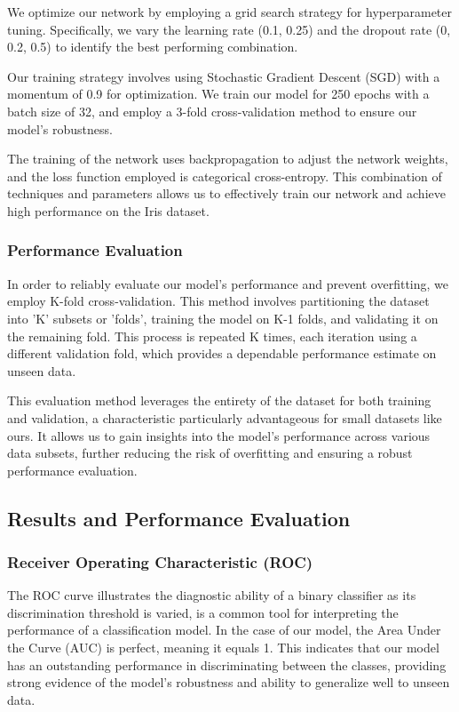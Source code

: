 \documentclass[conference]{inc/IEEEtran}
\begin{document}
We optimize our network by employing a grid search strategy for hyperparameter tuning. Specifically, we vary the learning rate (0.1, 0.25) and the dropout rate (0, 0.2, 0.5) to identify the best performing combination.

Our training strategy involves using Stochastic Gradient Descent (SGD) with a momentum of 0.9 for optimization. We train our model for 250 epochs with a batch size of 32, and employ a 3-fold cross-validation method to ensure our model's robustness.

The training of the network uses backpropagation to adjust the network weights, and the loss function employed is categorical cross-entropy. This combination of techniques and parameters allows us to effectively train our network and achieve high performance on the Iris dataset.

\subsubsection{Performance Evaluation}

In order to reliably evaluate our model's performance and prevent overfitting, we employ K-fold cross-validation. This method involves partitioning the dataset into 'K' subsets or 'folds', training the model on K-1 folds, and validating it on the remaining fold. This process is repeated K times, each iteration using a different validation fold, which provides a dependable performance estimate on unseen data.

This evaluation method leverages the entirety of the dataset for both training and validation, a characteristic particularly advantageous for small datasets like ours. It allows us to gain insights into the model's performance across various data subsets, further reducing the risk of overfitting and ensuring a robust performance evaluation.

\subsection{Results and Performance Evaluation}

\subsubsection{Receiver Operating Characteristic (ROC)}

The ROC curve illustrates the diagnostic ability of a binary classifier as its discrimination threshold is varied, is a common tool for interpreting the performance of a classification model. In the case of our model, the Area Under the Curve (AUC) is perfect, meaning it equals 1. This indicates that our model has an outstanding performance in discriminating between the classes, providing strong evidence of the model's robustness and ability to generalize well to unseen data.
\end{document}
